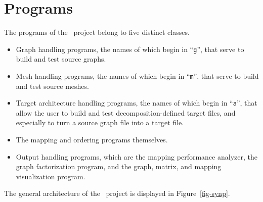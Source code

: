 
\section{Programs}
\label{sec-prog}

The programs of the \scotch\ project belong to five distinct classes.
\begin{itemize}
\item
Graph handling programs, the names of which begin in ``\texttt{g}'',
that serve to build and test source graphs.
\item
Mesh handling programs, the names of which begin in ``\texttt{m}'',
that serve to build and test source meshes.
\item
Target architecture handling programs, the names of which begin
in ``\texttt{a}'', that allow the user to build and test decomposition-defined
target files, and especially to turn a source graph file into a target file.
\item
The mapping and ordering programs themselves.
\item
Output handling programs, which are
the mapping performance analyzer, the graph factorization program,
and the graph, matrix, and mapping visualization program.
\end{itemize}
The general architecture of the \scotch\ project is displayed in
Figure~\ref{fig-synp}.

